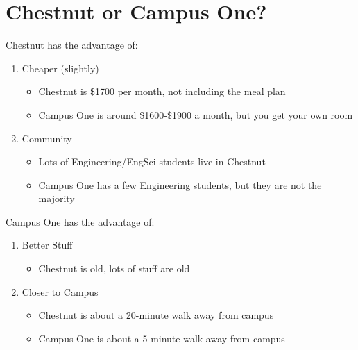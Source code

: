 \section{Chestnut or Campus One?}

Chestnut has the advantage of: 

\begin{enumerate}
    \item Cheaper (slightly)
    \begin{itemize}
        \item Chestnut is \$1700 per month, not including the meal plan
        \item Campus One is around \$1600-\$1900 a month, but you get your own room
    \end{itemize}
    \item Community
    \begin{itemize}
        \item Lots of Engineering/EngSci students live in Chestnut
        \item Campus One has a few Engineering students, but they are not the majority
    \end{itemize}
\end{enumerate}

Campus One has the advantage of: 
\begin{enumerate}
    \item Better Stuff
    \begin{itemize}
        \item Chestnut is old, lots of stuff are old
    \end{itemize}
    \item Closer to Campus
    \begin{itemize}
        \item Chestnut is about a 20-minute walk away from campus
        \item Campus One is about a 5-minute walk away from campus
    \end{itemize}
\end{enumerate}
